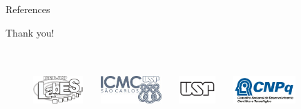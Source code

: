 \documentclass[xcolor=pdftex,dvipsnames,aspectratio=169]{beamer}
\begin{document}
\begin{frame}{References}


\end{frame}

\begin{frame}
	\begin{center}
	\Huge{Thank you!}
	\\~	\\~
	\begin{figure}
	\captionsetup{justification=centering}
	\includegraphics[height=30pt]{logos/garland_logo_mini.png}
	~~~\includegraphics[height=30pt]{logos/icmc_logo_mini.jpg}
	~~~\includegraphics[height=30pt]{logos/usp-logo-png_mini.png}
	~~~\includegraphics[height=30pt]{logos/cnpq_logo.png}
	\end{figure}
	
	\end{center}
\end{frame}
\end{document}
